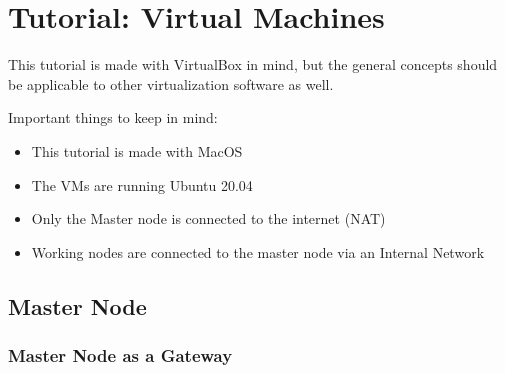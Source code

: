 
\chapter{Tutorial: Virtual Machines}

This tutorial is made with VirtualBox in mind, but the general concepts should be applicable to other virtualization software as well.

Important things to keep in mind:
\begin{itemize}
    \item This tutorial is made with MacOS 
    \item The VMs are running Ubuntu 20.04
    \item Only the Master node is connected to the internet (NAT)
    \item Working nodes are connected to the master node via an Internal Network
\end{itemize}

\section{Master Node}

\subsection{Master Node as a Gateway}

